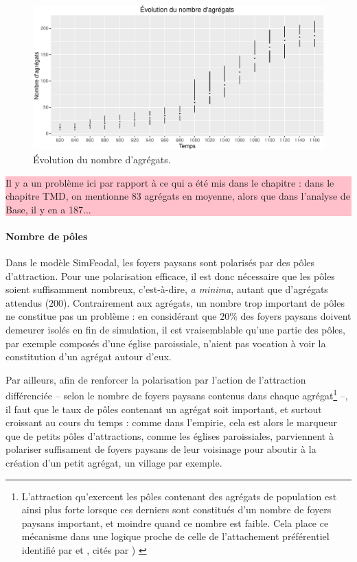 \documentclass[12pt, a4paper, oneside]{book}
\begin{document}
	\begin{figure}[H]
	\captionsetup{width=\linewidth}
	\includegraphics[width=\linewidth]{img/resultats/v0_nombre_agregats.pdf}
	\caption{Évolution du nombre d'agrégats.} 
	\label{fig:nombre-agregats-v0} 
\end{figure}

		\colorbox{pink}{\parbox{0.9\textwidth}{%
		\vskip5pt
		Il y a un problème ici par rapport à ce qui a été mis dans le chapitre : dans le chapitre TMD, on mentionne 83 agrégats en moyenne, alors que dans l'analyse de Base, il y en a 187...
		\vskip5pt
		}
	}	
		
	\paragraph{Nombre de pôles}
	
	Dans le modèle SimFeodal, les foyers paysans sont polarisés par des pôles d'attraction. Pour une polarisation efficace, il est donc nécessaire que les pôles soient suffisamment nombreux, c'est-à-dire, \textit{a minima}, autant que d'agrégats attendus ($200$). Contrairement aux agrégats, un nombre trop important de pôles ne constitue pas un problème : en considérant que $20\%$ des foyers paysans doivent demeurer isolés en fin de simulation, il est vraisemblable qu'une partie des pôles, par exemple composés d'une église paroissiale, n'aient pas vocation à voir la constitution d'un agrégat autour d'eux.
	
	Par ailleurs, afin de renforcer la polarisation par l'action de l'attraction différenciée -- selon le nombre de foyers paysans contenus dans chaque agrégat\footnote{L'attraction qu'exercent les pôles contenant des agrégats de population est ainsi plus forte lorsque ces derniers sont constitués d'un nombre de foyers paysans important, et moindre quand ce nombre est faible. Cela place ce mécanisme dans une logique proche de celle de l'attachement préférentiel identifié par \autocite{yule1925ii} et  \autocite{simon1955class}, cités par \autocite[93]{schmitt_modelisation_2014-1}) \label{ftn:attachement-preferentiel}} --, il faut que le taux de pôles contenant un agrégat soit important, et surtout croissant au cours du temps : comme dans l'empirie, cela est alors le marqueur que de petits pôles d'attractions, comme les églises paroissiales, parviennent à polariser suffisament de foyers paysans de leur voisinage pour aboutir à la création d'un petit agrégat, un village par exemple.
	
\end{document}

